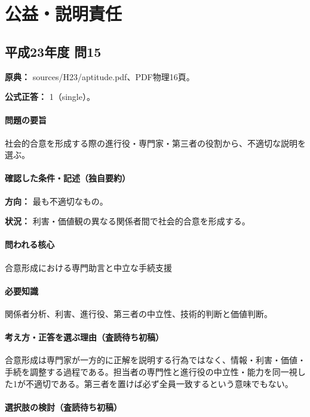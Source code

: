 \section{公益・説明責任}

\subsection{平成23年度 問15}
\label{q:h23-reg-apt-15}

\noindent\textbf{原典：} sources/H23/aptitude.pdf、PDF物理16頁。

\textbf{公式正答：} 1（single）。

\paragraph{問題の要旨} 社会的合意を形成する際の進行役・専門家・第三者の役割から、不適切な説明を選ぶ。

\paragraph{確認した条件・記述（独自要約）}\mbox{}\par

\noindent\textbf{方向：} 最も不適切なもの。\par

\noindent\textbf{状況：} 利害・価値観の異なる関係者間で社会的合意を形成する。\par

\paragraph{問われる核心} 合意形成における専門助言と中立な手続支援

\paragraph{必要知識} 関係者分析、利害、進行役、第三者の中立性、技術的判断と価値判断。

\paragraph{考え方・正答を選ぶ理由（査読待ち初稿）} 合意形成は専門家が一方的に正解を説明する行為ではなく、情報・利害・価値・手続を調整する過程である。担当者の専門性と進行役の中立性・能力を同一視した1が不適切である。第三者を置けば必ず全員一致するという意味でもない。

\paragraph{選択肢の検討（査読待ち初稿）}\mbox{}\par

